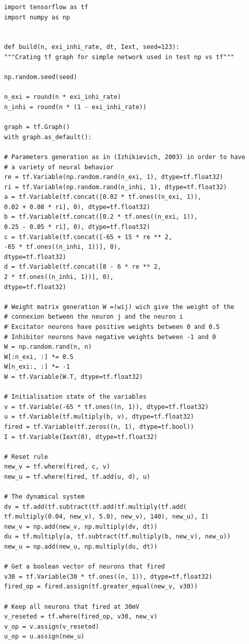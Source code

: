 \documentclass[12pt]{scrartcl}
\begin{document}
\begin{lstlisting}[caption = {Numpy vs Tensorflow : Implémentation Tensorflow}]
import tensorflow as tf
import numpy as np


def build(n, exi_inhi_rate, dt, Iext, seed=123):
"""Crating tf graph for simple network used in test np vs tf"""

np.random.seed(seed)

n_exi = round(n * exi_inhi_rate)
n_inhi = round(n * (1 - exi_inhi_rate))

graph = tf.Graph()
with graph.as_default():

# Parameters generation as in (Izhikievich, 2003) in order to have
# a variety of neural behavior
re = tf.Variable(np.random.rand(n_exi, 1), dtype=tf.float32)
ri = tf.Variable(np.random.rand(n_inhi, 1), dtype=tf.float32)
a = tf.Variable(tf.concat([0.02 * tf.ones((n_exi, 1)),
0.02 + 0.08 * ri], 0), dtype=tf.float32)
b = tf.Variable(tf.concat([0.2 * tf.ones((n_exi, 1)),
0.25 - 0.05 * ri], 0), dtype=tf.float32)
c = tf.Variable(tf.concat([-65 + 15 * re ** 2,
-65 * tf.ones((n_inhi, 1))], 0),
dtype=tf.float32)
d = tf.Variable(tf.concat([8 - 6 * re ** 2,
2 * tf.ones((n_inhi, 1))], 0),
dtype=tf.float32)

# Weight matrix generation W =(wij) wich give the weight of the 
# connexion between the neuron j and the neuron i
# Excitator neurons have positive weights between 0 and 0.5
# Inhibitor neurons have negative weights between -1 and 0
W = np.random.rand(n, n)
W[:n_exi, :] *= 0.5
W[n_exi:, :] *= -1
W = tf.Variable(W.T, dtype=tf.float32)

# Initialisation state of the variables
v = tf.Variable(-65 * tf.ones((n, 1)), dtype=tf.float32)
u = tf.Variable(tf.multiply(b, v), dtype=tf.float32)
fired = tf.Variable(tf.zeros((n, 1), dtype=tf.bool))
I = tf.Variable(Iext(0), dtype=tf.float32)

# Reset rule
new_v = tf.where(fired, c, v)
new_u = tf.where(fired, tf.add(u, d), u)

# The dynamical system
dv = tf.add(tf.subtract(tf.add(tf.multiply(tf.add(
tf.multiply(0.04, new_v), 5.0), new_v), 140), new_u), I)
new_v = np.add(new_v, np.multiply(dv, dt))
du = tf.multiply(a, tf.subtract(tf.multiply(b, new_v), new_u))
new_u = np.add(new_u, np.multiply(du, dt))

# Get a boolean vector of neurons that fired
v30 = tf.Variable(30 * tf.ones((n, 1)), dtype=tf.float32)
fired_op = fired.assign(tf.greater_equal(new_v, v30))

# Keep all neurons that fired at 30mV
v_reseted = tf.where(fired_op, v30, new_v)
v_op = v.assign(v_reseted)
u_op = u.assign(new_u)


\end{lstlisting}
\end{document}
